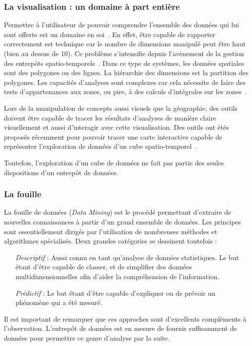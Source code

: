 \subsubsection{La visualisation : un domaine à part entière}
Permettre à l'utilisateur de pouvoir comprendre l'ensemble des données qui lui sont offerte est un domaine en soi~\cite{Maniatis:visualization}. En effet, être capable de rapporter correctement est technique car le nombre de dimensions manipulé peut être haut (bien au dessus de 10). Ce problème s'intensifie depuis l'avènement de la gestion des entrepôts spatio-temporels~\cite{Vaisman:spatiotemporal, Vaisman:continuous}. Dans ce type de systèmes, les données spatiales sont des polygones ou des lignes. La hiérarchie des dimensions est la partition des polygones. Les capacités d'analyses sont complexes car cela nécessite de faire des tests d'appartenances aux zones, ou pire, à des calculs d'intégrales sur les zones~\cite{Guting:movingobjects}.

Lors de la manipulation de concepts aussi visuels que la géographie, des outils doivent être capable de tracer les résultats d'analyses de manière claire visuellement et aussi d'interagir avec cette visualisation. Des outils ont étés proposés récemment pour pouvoir tracer une carte interactive capable de représenter l'exploration de données d'un cube spatio-temporel~\cite{Rivest:solap}.

Toutefois, l'exploration d'un cube de données ne fait pas partie des seules dispositions d'un entrepôt de données.
\subsubsection{La fouille}
La fouille de données (\textit{Data Mining}) est le procédé permettant d'extraire de nouvelles connaissances à partir d'un grand ensemble de données. Les principes sont essentiellement dirigés par l'utilisation de nombreuses méthodes et algorithmes spécialisés. Deux grandes catégories se dessinent toutefois :
\begin{itemize}
    \item[\textit{Descriptif}] : Aussi connu en tant qu'analyse de données statistiques. Le but étant d'être capable de classer, et de simplifier des données multidimensionnelles afin d'aider la compréhension de l'information.
    \item[\textit{Prédictif}] : Le but étant d'être capable d'expliquer ou de prévoir un phénomène qui a été mesuré.
\end{itemize}
Il est important de remarquer que ces approches sont d'excellents compléments à l'observation. L'entrepôt de données est en mesure de fournir suffisamment de données pour permettre ce genre d'analyse par la suite.

